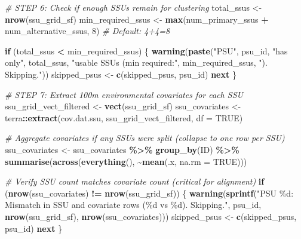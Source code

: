 \documentclass[
  10pt,
  b5paper,
  oneside]{book}
\newenvironment{Shaded}{\begin{snugshade}}{\end{snugshade}}
\newcommand{\AttributeTok}[1]{\textcolor[rgb]{0.13,0.29,0.53}{#1}}
\newcommand{\CommentTok}[1]{\textcolor[rgb]{0.56,0.35,0.01}{\textit{#1}}}
\newcommand{\ConstantTok}[1]{\textcolor[rgb]{0.56,0.35,0.01}{#1}}
\newcommand{\ControlFlowTok}[1]{\textcolor[rgb]{0.13,0.29,0.53}{\textbf{#1}}}
\newcommand{\DecValTok}[1]{\textcolor[rgb]{0.00,0.00,0.81}{#1}}
\newcommand{\FunctionTok}[1]{\textcolor[rgb]{0.13,0.29,0.53}{\textbf{#1}}}
\newcommand{\NormalTok}[1]{#1}
\newcommand{\OtherTok}[1]{\textcolor[rgb]{0.56,0.35,0.01}{#1}}
\newcommand{\SpecialCharTok}[1]{\textcolor[rgb]{0.81,0.36,0.00}{\textbf{#1}}}
\newcommand{\StringTok}[1]{\textcolor[rgb]{0.31,0.60,0.02}{#1}}
\begin{document}
\begin{Shaded}
\begin{Highlighting}[]
  \CommentTok{\# STEP 6: Check if enough SSUs remain for clustering}
\NormalTok{  total\_ssus }\OtherTok{\textless{}{-}} \FunctionTok{nrow}\NormalTok{(ssu\_grid\_sf)}
\NormalTok{  min\_required\_ssus }\OtherTok{\textless{}{-}} \FunctionTok{max}\NormalTok{(num\_primary\_ssus }\SpecialCharTok{+}\NormalTok{ num\_alternative\_ssus, }\DecValTok{8}\NormalTok{)  }\CommentTok{\# Default: 4+4=8}
  
  \ControlFlowTok{if}\NormalTok{ (total\_ssus }\SpecialCharTok{\textless{}}\NormalTok{ min\_required\_ssus) \{}
    \FunctionTok{warning}\NormalTok{(}\FunctionTok{paste}\NormalTok{(}\StringTok{"PSU"}\NormalTok{, psu\_id, }\StringTok{"has only"}\NormalTok{, total\_ssus, }
                  \StringTok{"usable SSUs (min required:"}\NormalTok{, min\_required\_ssus, }\StringTok{"). Skipping."}\NormalTok{))}
\NormalTok{    skipped\_psus }\OtherTok{\textless{}{-}} \FunctionTok{c}\NormalTok{(skipped\_psus, psu\_id)}
    \ControlFlowTok{next}
\NormalTok{  \}}
  
  \CommentTok{\# STEP 7: Extract 100m environmental covariates for each SSU}
\NormalTok{  ssu\_grid\_vect\_filtered }\OtherTok{\textless{}{-}} \FunctionTok{vect}\NormalTok{(ssu\_grid\_sf)}
\NormalTok{  ssu\_covariates }\OtherTok{\textless{}{-}}\NormalTok{ terra}\SpecialCharTok{::}\FunctionTok{extract}\NormalTok{(cov.dat.ssu, ssu\_grid\_vect\_filtered, }\AttributeTok{df =} \ConstantTok{TRUE}\NormalTok{)}
  
  \CommentTok{\# Aggregate covariates if any SSUs were split (collapse to one row per SSU)}
\NormalTok{  ssu\_covariates }\OtherTok{\textless{}{-}}\NormalTok{ ssu\_covariates }\SpecialCharTok{\%\textgreater{}\%}
    \FunctionTok{group\_by}\NormalTok{(ID) }\SpecialCharTok{\%\textgreater{}\%}
    \FunctionTok{summarise}\NormalTok{(}\FunctionTok{across}\NormalTok{(}\FunctionTok{everything}\NormalTok{(), }\SpecialCharTok{\textasciitilde{}}\FunctionTok{mean}\NormalTok{(.x, }\AttributeTok{na.rm =} \ConstantTok{TRUE}\NormalTok{)))}
  
  \CommentTok{\# Verify SSU count matches covariate count (critical for alignment)}
  \ControlFlowTok{if}\NormalTok{ (}\FunctionTok{nrow}\NormalTok{(ssu\_covariates) }\SpecialCharTok{!=} \FunctionTok{nrow}\NormalTok{(ssu\_grid\_sf)) \{}
    \FunctionTok{warning}\NormalTok{(}\FunctionTok{sprintf}\NormalTok{(}\StringTok{"PSU \%d: Mismatch in SSU and covariate rows (\%d vs \%d). Skipping."}\NormalTok{, }
\NormalTok{                    psu\_id, }\FunctionTok{nrow}\NormalTok{(ssu\_grid\_sf), }\FunctionTok{nrow}\NormalTok{(ssu\_covariates)))}
\NormalTok{    skipped\_psus }\OtherTok{\textless{}{-}} \FunctionTok{c}\NormalTok{(skipped\_psus, psu\_id)}
    \ControlFlowTok{next}
\NormalTok{  \}}
  

\end{Highlighting}
\end{Shaded}
\end{document}
